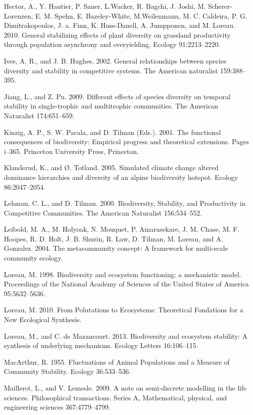 \documentclass[12pt,]{article}
\begin{document}
Hector, A., Y. Hautier, P. Saner, L.Wacker, R. Bagchi, J. Joshi, M.
Scherer-Lorenzen, E. M. Spehn, E. Bazeley-White, M.Weilenmann, M. C.
Caldeira, P. G. Dimitrakopoulos, J. a. Finn, K. Huss-Danell, A.
Jumpponen, and M. Loreau. 2010. General stabilizing effects of plant
diversity on grassland productivity through population asynchrony and
overyielding. Ecology 91:2213--2220.

Ives, A. R., and J. B. Hughes. 2002. General relationships between
species diversity and stability in competitive systems. The American
naturalist 159:388--395.

Jiang, L., and Z. Pu. 2009. Different effects of species diversity on
temporal stability in single-trophic and multitrophic communities. The
American Naturalist 174:651--659.

Kinzig, A. P., S. W. Pacala, and D. Tilman (Eds.). 2001. The functional
consequences of biodiversity: Empirical progress and theoretical
extensions. Pages i--365. Princeton University Press, Princeton.

Klanderud, K., and Ø. Totland. 2005. Simulated climate change altered
dominance hierarchies and diversity of an alpine biodiversity hotspot.
Ecology 86:2047--2054.

Lehman, C. L., and D. Tilman. 2000. Biodiversity, Stability, and
Productivity in Competitive Communities. The American Naturalist
156:534--552.

Leibold, M. A., M. Holyoak, N. Mouquet, P. Amarasekare, J. M. Chase, M.
F. Hoopes, R. D. Holt, J. B. Shurin, R. Law, D. Tilman, M. Loreau, and
A. Gonzalez. 2004. The metacommunity concept: A framework for
multi-scale community ecology.

Loreau, M. 1998. Biodiversity and ecosystem functioning: a mechanistic
model. Proceedings of the National Academy of Sciences of the United
States of America 95:5632--5636.

Loreau, M. 2010. From Polutations to Ecosystems: Theoretical Fondations
for a New Ecological Synthesis.

Loreau, M., and C. {{de Mazancourt}}. 2013. Biodiversity and ecosystem
stability: A synthesis of underlying mechanisms. Ecology Letters
16:106--115.

MacArthur, R. 1955. Fluctuations of Animal Populations and a Measure of
Community Stability. Ecology 36:533--536.

Mailleret, L., and V. Lemesle. 2009. A note on semi-discrete modelling
in the life sciences. Philosophical transactions. Series A,
Mathematical, physical, and engineering sciences 367:4779--4799.
\end{document}
